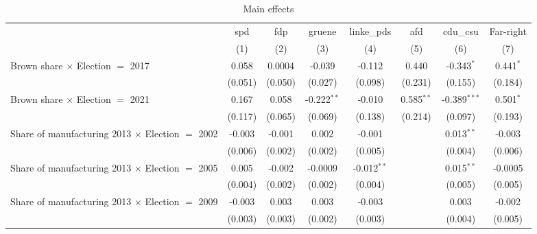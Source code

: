 \begin{table}[htbp]
   \caption{Main effects}
   \centering
   \begin{tabular}{lccccccc}
      \tabularnewline \midrule \midrule
                                                              & spd           & fdp          & gruene         & linke\_pds    & afd            & cdu\_csu       & Far-right\\  
                                                              & (1)           & (2)          & (3)            & (4)           & (5)            & (6)            & (7)\\  
      Brown share $\times$ Election $=$ 2017                  & 0.058         & 0.0004       & -0.039         & -0.112        & 0.440          & -0.343$^{*}$   & 0.441$^{*}$\\   
                                                              & (0.051)       & (0.050)      & (0.027)        & (0.098)       & (0.231)        & (0.155)        & (0.184)\\   
      Brown share $\times$ Election $=$ 2021                  & 0.167         & 0.058        & -0.222$^{**}$  & -0.010        & 0.585$^{**}$   & -0.389$^{***}$ & 0.501$^{*}$\\   
                                                              & (0.117)       & (0.065)      & (0.069)        & (0.138)       & (0.214)        & (0.097)        & (0.193)\\   
      Share of manufacturing 2013 $\times$ Election $=$ 2002  & -0.003        & -0.001       & 0.002          & -0.001        &                & 0.013$^{**}$   & -0.003\\   
                                                              & (0.006)       & (0.002)      & (0.002)        & (0.005)       &                & (0.004)        & (0.006)\\   
      Share of manufacturing 2013 $\times$ Election $=$ 2005  & 0.005         & -0.002       & -0.0009        & -0.012$^{**}$ &                & 0.015$^{**}$   & -0.0005\\   
                                                              & (0.004)       & (0.002)      & (0.002)        & (0.004)       &                & (0.005)        & (0.005)\\   
      Share of manufacturing 2013 $\times$ Election $=$ 2009  & -0.003        & 0.003        & 0.003          & -0.003        &                & 0.003          & -0.002\\   
                                                              & (0.003)       & (0.003)      & (0.002)        & (0.003)       &                & (0.004)        & (0.005)\\   

\end{tabular}
\end{table}
